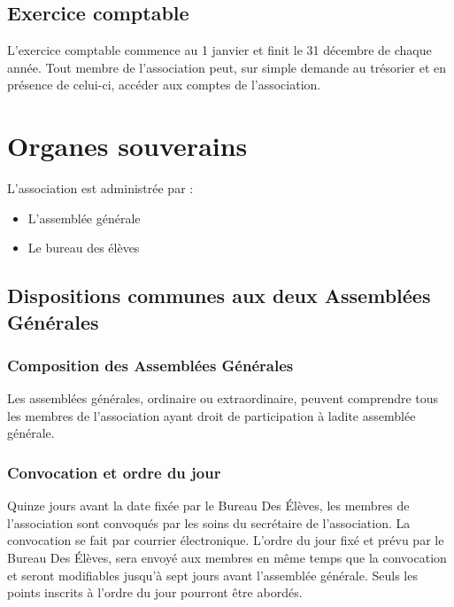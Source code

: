 \documentclass{article}
\begin{document}
		\subsection{Exercice comptable}
			L’exercice comptable commence au 1 janvier et finit le 31
			décembre de chaque année. Tout membre de l’association peut, sur
			simple demande au trésorier et en présence de celui-ci, accéder aux
			comptes de l’association.

	\section{Organes souverains}
		L’association est administrée par :
		\begin{itemize}
			\item L’assemblée générale
			\item Le bureau des élèves
		\end{itemize}

		\subsection{Dispositions communes aux deux Assemblées Générales}
			\subsubsection{Composition des Assemblées Générales}
				Les assemblées générales, ordinaire ou extraordinaire, peuvent
				comprendre tous les membres de l’association ayant droit de
				participation à ladite assemblée générale.

			\subsubsection{Convocation et ordre du jour}
			\label{sssec:convocation}
				Quinze jours avant la date fixée par le Bureau Des Élèves, les
				membres de l’association sont convoqués par les soins du
				secrétaire
				de l’association. La convocation se fait par courrier électronique. 
				L’ordre du jour fixé et prévu par le Bureau Des Élèves, sera
				envoyé
				aux membres en même temps que la convocation et seront modifiables
				jusqu’à sept jours avant l'assemblée générale. Seuls les points
				inscrits à l’ordre du jour pourront être abordés.
				
\end{document}
